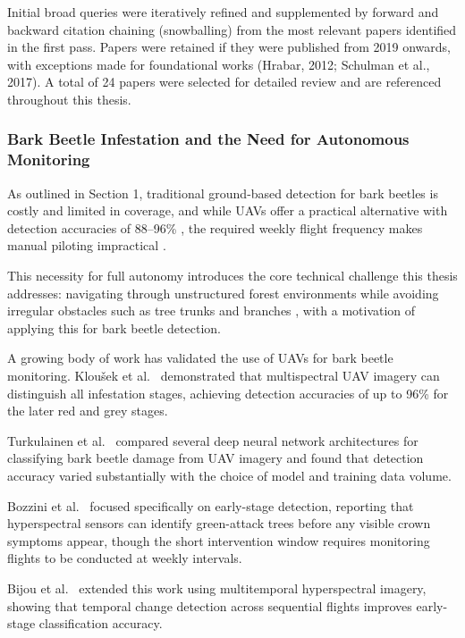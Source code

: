 \documentclass[../main.tex]{subfiles}
\begin{document}
Initial broad queries were iteratively refined and supplemented by forward and backward citation chaining (snowballing) from the most relevant papers identified in the first pass. Papers were retained if they were published from 2019 onwards, with exceptions made for foundational works (Hrabar, 2012; Schulman et al., 2017). A total of 24 papers were selected for detailed review and are referenced throughout this thesis.

\subsubsection{Bark Beetle Infestation and the Need for Autonomous Monitoring}

As outlined in Section 1, traditional ground-based detection for bark beetles is costly and limited in coverage, and while UAVs offer a practical alternative with detection accuracies of 88--96\% \cite{Klousek2019,Turkulainen2023,Bozzini2024}, the required weekly flight frequency makes manual piloting impractical \cite{Bozzini2024,Bijou2025}.

This necessity for full autonomy introduces the core technical challenge this thesis addresses: navigating through unstructured forest environments while avoiding irregular obstacles such as tree trunks and branches \cite{Butt2024,Merei2025,Debnath2024}, with a motivation of applying this for bark beetle detection.

A growing body of work has validated the use of UAVs for bark beetle monitoring. Klou\v{s}ek et al.\ \cite{Klousek2019} demonstrated that multispectral UAV imagery can distinguish all infestation stages, achieving detection accuracies of up to 96\% for the later red and grey stages.

Turkulainen et al.\ \cite{Turkulainen2023} compared several deep neural network architectures for classifying bark beetle damage from UAV imagery and found that detection accuracy varied substantially with the choice of model and training data volume.

Bozzini et al.\ \cite{Bozzini2024} focused specifically on early-stage detection, reporting that hyperspectral sensors can identify green-attack trees before any visible crown symptoms appear, though the short intervention window requires monitoring flights to be conducted at weekly intervals.

Bijou et al.\ \cite{Bijou2025} extended this work using multitemporal hyperspectral imagery, showing that temporal change detection across sequential flights improves early-stage classification accuracy.
\end{document}

